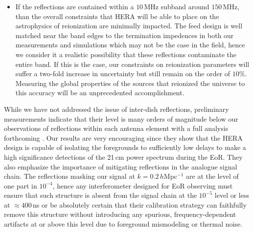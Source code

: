 \documentclass[twocolumn]{emulateapj}
\begin{document}
\begin{itemize}
\item If the reflections are contained within a $10$\,MHz subband around $150$\,MHz, than the overall constraints that HERA will be able to place on the astrophysics of reionization are minimally impacted. The feed design is well matched near the band edges to the termination impedences in both our measurements and simulations which may not be the case in the field, hence we consider it a realistic possibility that these reflections contaminate the entire band. If this is the case, our constraints on reionization parameters will suffer a two-fold increase in uncertainty but still remain on the order of $10$\%. Measuring the global properties of the sources that reionized the universe to this accuracy will be an unprecedented accomplishment. 
\end{itemize}

While we have not addressed the issue of inter-dish reflections, preliminary measurements indicate that their level is many orders of magnitude below our observations of reflections within each antenna element with a full analysis forthcoming \citep{Patra:2016}. Our results are very encouraging since they show that the HERA design is capable of isolating the foregrounds to sufficiently low delays to make a high significance detections of the 21\,cm power spectrum during the EoR. They also emphasize the importance of mitigating reflections in the analogue signal chain. The reflections masking our signal at $k=0.2$\,$h$Mpc$^{-1}$ are at the level of one part in $10^{-4}$, hence any interferometer designed for EoR observing must ensure that such structure is absent from the signal chain at the $10^{-5}$ level or less at $\approx 400$\,ns or be absolutely certain that their calibration strategy can faithfully remove this structure without introducing any spurious, frequency-dependent artifacts at or above this level due to foreground mismodeling or thermal noise. 



\end{document}
